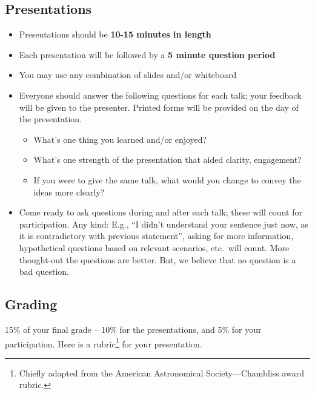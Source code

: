 \documentclass[11pt]{article}
\begin{document}
\subsection*{Presentations}
\begin{itemize}
    \item Presentations should be \textbf{10-15 minutes in length}
    \item Each presentation will be followed by a \textbf{5 minute question period}
    \item You may use any combination of slides and/or whiteboard
    \item Everyone should answer the following questions for each talk; your feedback will be given to the presenter. Printed forms will be provided on the day of the presentation.
    \begin{itemize}
        \item What's one thing you learned and/or enjoyed?
        \item What's one strength of the presentation that aided clarity, engagement?
        \item If you were to give the same talk, what would you change to convey
            the ideas more clearly?
    \end{itemize}
    \item Come ready to ask questions during and after each talk; these will count for participation.  Any kind: E.g., ``I didn't understand your sentence just now, as it is contradictory with previous statement'', asking for more information, hypothetical questions based on relevant scenarios, etc.~will count. More thought-out the questions are better. But, we believe that no question is a bad question.
\end{itemize}

\subsection*{Grading}
15\% of your final grade -- 10\% for the presentations, and 5\% for your participation. Here is a rubric\footnote{Chiefly adapted from the American Astronomical Society---Chambliss award rubric.} for your presentation.
\end{document}
